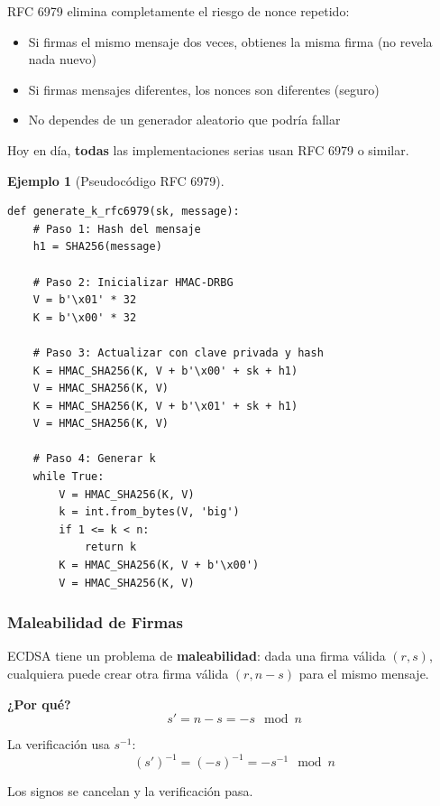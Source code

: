 \documentclass[11pt,a4paper,twoside,openright]{book}
\theoremstyle{definition}
\newtheorem{example}{Ejemplo}[chapter]
\theoremstyle{plain}
\theoremstyle{remark}
\begin{document}
\begin{intuicion}
RFC 6979 elimina completamente el riesgo de nonce repetido:
\begin{itemize}
    \item Si firmas el mismo mensaje dos veces, obtienes la misma firma (no revela nada nuevo)
    \item Si firmas mensajes diferentes, los nonces son diferentes (seguro)
    \item No dependes de un generador aleatorio que podría fallar
\end{itemize}

Hoy en día, \textbf{todas} las implementaciones serias usan RFC 6979 o similar.
\end{intuicion}

\begin{example}[Pseudocódigo RFC 6979]
\begin{verbatim}
def generate_k_rfc6979(sk, message):
    # Paso 1: Hash del mensaje
    h1 = SHA256(message)
    
    # Paso 2: Inicializar HMAC-DRBG
    V = b'\x01' * 32
    K = b'\x00' * 32
    
    # Paso 3: Actualizar con clave privada y hash
    K = HMAC_SHA256(K, V + b'\x00' + sk + h1)
    V = HMAC_SHA256(K, V)
    K = HMAC_SHA256(K, V + b'\x01' + sk + h1)
    V = HMAC_SHA256(K, V)
    
    # Paso 4: Generar k
    while True:
        V = HMAC_SHA256(K, V)
        k = int.from_bytes(V, 'big')
        if 1 <= k < n:
            return k
        K = HMAC_SHA256(K, V + b'\x00')
        V = HMAC_SHA256(K, V)
\end{verbatim}
\end{example}

\subsubsection{Maleabilidad de Firmas}

\begin{advertencia}
ECDSA tiene un problema de \textbf{maleabilidad}: dada una firma válida $(r, s)$, cualquiera puede crear otra firma válida $(r, n - s)$ para el mismo mensaje.

\textbf{¿Por qué?}
\[ s' = n - s = -s \mod n \]

La verificación usa $s^{-1}$:
\[ (s')^{-1} = (-s)^{-1} = -s^{-1} \mod n \]

Los signos se cancelan y la verificación pasa.
\end{advertencia}
\end{document}
